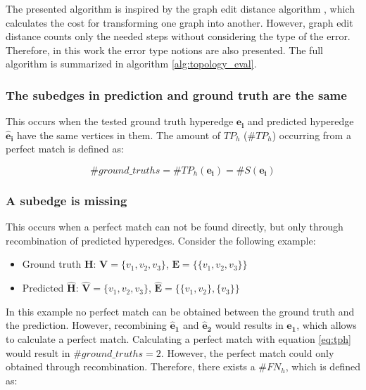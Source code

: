 The presented algorithm is inspired by the graph edit distance algorithm \cite{graph_edit_distance}, which calculates the cost for transforming one graph into another.
However, graph edit distance counts only the needed steps without considering the type of the error.
Therefore, in this work the error type notions are also presented.
The full algorithm is summarized in algorithm \ref{alg:topology_eval}.

\subsubsection{The subedges in prediction and ground truth are the same}
This occurs when the tested ground truth hyperedge $\mathbf{e_i}$ and predicted hyperedge $\mathbf{\hat{e}_i}$ have the same vertices in them.
The amount of $TP_h$ ($\#TP_h$) occurring from a perfect match is defined as:

\begin{equation}
    \#ground\_truths = \#TP_h(\mathbf{e_i}) = \#S(\mathbf{e_i})
    \label{eq:tph}
\end{equation}


\subsubsection{A subedge is missing}
This occurs when a perfect match can not be found directly, but only through recombination of predicted hyperedges.
Consider the following example:

\begin{itemize}
    \item Ground truth $\mathbf{H}$: $\mathbf{V} = \{v_1, v_2, v_3\}$, $\mathbf{E} = \{\{v_1, v_2, v_3\}\}$
    \item Predicted $\mathbf{\hat{H}}$: $\mathbf{\hat{V}} = \{v_1, v_2, v_3\}$, $\mathbf{\hat{E}} = \{\{v_1, v_2\}, \{v_3\}\}$
\end{itemize}

In this example no perfect match can be obtained between the ground truth and the prediction.
However, recombining $\mathbf{\hat{e}_1}$ and $\mathbf{\hat{e}_2}$ would results in $\mathbf{e_1}$, which allows to calculate a perfect match.
Calculating a perfect match with equation \ref{eq:tph} would result in $\#ground\_truths = 2$.
However, the perfect match could only obtained through recombination.
Therefore, there exists a $\#FN_h$, which is defined as:

